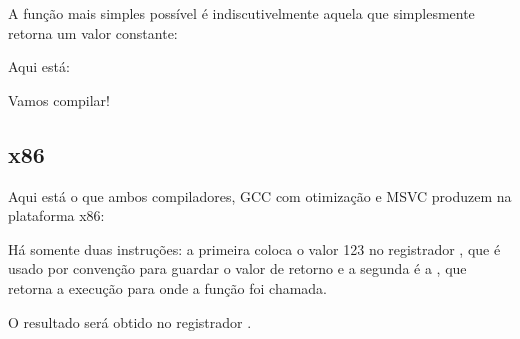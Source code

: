 
A função mais simples possível é indiscutivelmente aquela que simplesmente retorna um valor constante:

Aqui está:



Vamos compilar!

\subsection{x86}

Aqui está o que ambos compiladores, GCC com otimização e MSVC produzem na plataforma x86:



Há somente duas instruções: a primeira coloca o valor 123 no registrador \EAX, que é usado por convenção para guardar o valor de retorno e a segunda é a \RET, que retorna a execução para onde a função foi chamada.

O resultado será obtido no registrador \EAX.


